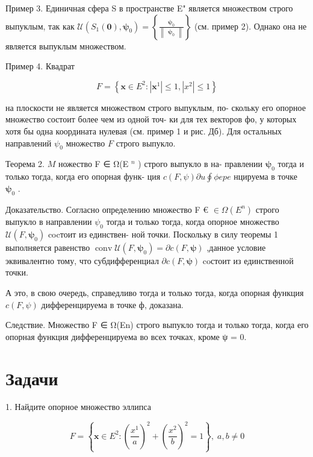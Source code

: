 \documentclass[8pt]{extarticle}
\begin{document}
Пример 3. Единичная сфера S в пространстве E" является множеством строго выпуклым, так как \(\mathcal{U}\left( {{S}_{1}\left( \mathbf{0}\right) ,{\mathbf{\psi }}_{0}}\right)  = \left\{  \frac{{\mathbf{\psi }}_{0}}{\left\lVert \begin{array}{c} {\mathbf{\psi }}_{0} \end{array} \right\rVert}\right\}\) (см. пример 2). Однако она не является выпуклым множеством.

Пример 4. Квадрат

\[
F = \left\{  {\mathbf{x} \in  {E}^{2} : \left| {\mathbf{x}}^{1}\right|  \leq  1,\left| {x}^{2}\right|  \leq  1}\right\}
\]

на плоскости не является множеством строго выпуклым, по- скольку его опорное множество состоит более чем из одной точ- ки для тех векторов фо, у которых хотя бы одна координата нулевая (см. пример 1 и рис. Дб). Для остальных направлений \({\psi }_{0}\) множество \(F\) строго выпукло.

Теорема 2. \(M\) ножество F ∈ Ω(E \({}^{n}\) ) строго выпукло в на- правлении \({\mathbf{\psi }}_{0}\) тогда и только тогда, когда его опорная функ- ция \(c\left( {F,\psi }\right) \partial u\oint {\phi epe}\) нцируема в точке \({\mathbf{\psi }}_{0}\) .

Доказательство. Согласно определению множество F € \(\in  \Omega \left( {E}^{n}\right)\) строго выпукло в направлении \({\psi }_{0}\) тогда и только тогда, когда опорное множество \(\mathcal{U}\left( {F,{\mathbf{\psi }}_{0}}\right)\) cocтоит из единствен- ной точки. Поскольку в силу теоремы 1 выполняется равенство \(\operatorname{conv}\mathcal{U}\left( {F,{\mathbf{\psi }}_{0}}\right)  = \partial c\left( {F,\mathbf{\psi }}\right)\) ,данное условие эквивалентно тому, что субдифференциал \(\partial c\left( {F,\mathbf{\psi }}\right)\) coстоит из единственной точки.

А это, в свою очередь, справедливо тогда и только тогда, когда опорная функция \(c\left( {F,\psi }\right)\) дифференцируема в точке ф, доказана.

Следствие. Множество F ∈ Ω(En) строго выпукло тогда и только тогда, когда его опорная функция дифференцируема во всех точках, кроме ψ = 0.

\section*{Задачи}

1. Найдите опорное множество эллипса

\[
F = \left\{  {\mathbf{x} \in  {E}^{2} : {\left( \frac{{x}^{1}}{a}\right) }^{2} + {\left( \frac{{x}^{2}}{b}\right) }^{2} = 1}\right\}  ,\;a,b \neq  0
\]
\end{document}
